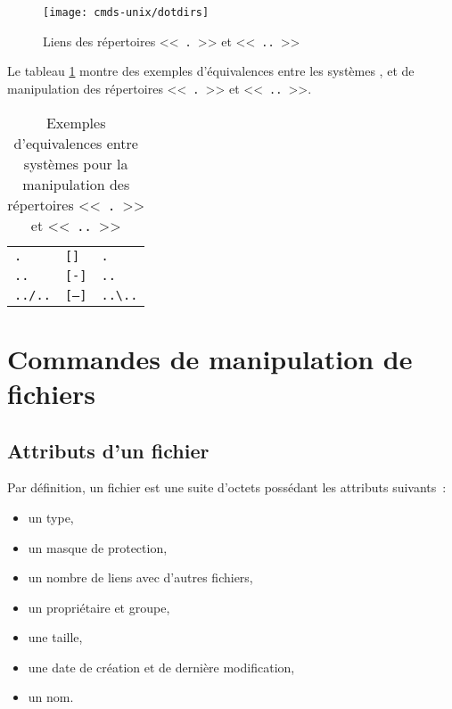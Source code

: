 \begin{figure}[hbtp]
\centering
\texttt{[image: cmds-unix/dotdirs]}
\caption{\label{fig-cmds-dotdirs}Liens des r{\'e}pertoires <<~{\tt .}~>> et
<<~{\tt ..}~>>}
\end{figure}

Le tableau \ref{tab-cmds-dotdirs} montre des exemples d'{\'e}quivalences
entre les syst{\`e}mes {\Unix}, {\OpenVMS} et {\DOS} de manipulation des
r{\'e}pertoires <<~{\tt .}~>> et <<~{\tt ..}~>>.

\begin{table}[hbtp]
\centering
\begin{tabular}{|l|l|l|}
	\hline
	{\Unix}		&	{\OpenVMS}	&	{\DOS}	\\
	\hline \hline
	{\tt .}		&	{\tt []}	&	{\tt .}			\\
	{\tt ..}	&	{\tt [-]}	&	{\tt ..}		\\
	{\tt ../..}	&	{\tt [--]}	&	\verb=..\..=	\\
	\hline
\end{tabular}
\caption{\label{tab-cmds-dotdirs}Exemples d'equivalences entre syst{\`e}mes pour
la manipulation des r{\'e}pertoires <<~{\tt .}~>> et <<~{\tt ..}~>>}
\end{table}

\section{Commandes de manipulation de fichiers}

\subsection{Attributs d'un fichier}

Par d{\'e}finition, un fichier est une suite d'octets poss{\'e}dant les
attributs suivants~:
\begin{itemize}
	\item	un type,
	\item	un masque de protection,
	\item	un nombre de liens avec d'autres fichiers,
	\item	un propri{\'e}taire et groupe,
	\item	une taille,
	\item	une date de cr{\'e}ation et de derni{\`e}re modification,
	\item	un nom.
\end{itemize}

